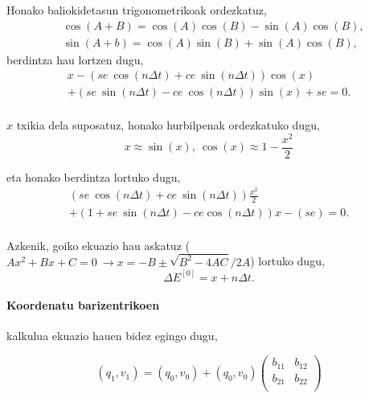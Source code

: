 Honako baliokidetasun trigonometrikoak ordezkatuz,
\begin{align*}
& \cos(A+B) =\cos(A)\cos(B)-\sin(A)\cos(B),\\
& \sin(A+b) =\cos(A)\sin(B)+\sin(A)\cos(B),
\end{align*}
berdintza hau lortzen dugu,
\begin{multline*}
x- (se \ \cos(n \Delta t)+ ce \ \sin(n \Delta t)) \cos(x) \\
    + (se \ \sin(n \Delta t)-ce \ \cos(n \Delta t)) \sin(x)+se =0.
\end{multline*}

\paragraph*{}$x$ txikia dela suposatuz, honako hurbilpenak ordezkatuko dugu,
\begin{equation*}
x \approx \sin(x), \ \cos(x) \approx 1- \frac{x^2}{2}
\end{equation*}

eta honako berdintza lortuko dugu,
\begin{multline*}
(se \ \cos(n \Delta t)+ce \ \sin(n \Delta t)) \frac{x^2}{2} \\
+ (1+se \ \sin(n \Delta t)-ce \cos(n \Delta t))x-(se )=0.
\end{multline*}

\paragraph*{} Azkenik, goiko ekuazio hau askatuz ($Ax^2+Bx+C=0 \ \rightarrow x={-B\pm \sqrt{B^2-4AC}}/{2A}$) lortuko dugu,
\begin{equation*}
\Delta E^{[0]}=x+n\Delta t.
\end{equation*}

\paragraph*{Koordenatu barizentrikoen} kalkulua ekuazio hauen bidez egingo dugu,

\begin{equation*}
(q_1,v_1)=(q_0,v_0)+ (q_0,v_0) \left(\begin{array}{cc}
                                       b_{11} & b_{12} \\
                                       b_{21} & b_{22} \\
                                \end{array}\right)
\end{equation*}


